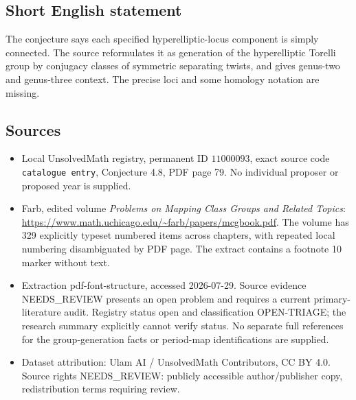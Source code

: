 \documentclass[11pt]{article}
\begin{document}
\subsection{Short English statement}
The conjecture says each specified hyperelliptic-locus component is simply connected. The source reformulates it as generation of the hyperelliptic Torelli group by conjugacy classes of symmetric separating twists, and gives genus-two and genus-three context. The precise loci and some homology notation are missing.
\subsection{Sources}
\begin{itemize}
\item Local UnsolvedMath registry, permanent ID \(11000093\), exact source code \texttt{catalogue entry}, Conjecture 4.8, PDF page 79. No individual proposer or proposed year is supplied.
\item Farb, edited volume \emph{Problems on Mapping Class Groups and Related Topics}: \url{https://www.math.uchicago.edu/~farb/papers/mcgbook.pdf}. The volume has 329 explicitly typeset numbered items across chapters, with repeated local numbering disambiguated by PDF page. The extract contains a footnote 10 marker without text.
\item Extraction pdf-font-structure, accessed 2026-07-29. Source evidence NEEDS\_REVIEW presents an open problem and requires a current primary-literature audit. Registry status open and classification OPEN-TRIAGE; the research summary explicitly cannot verify status. No separate full references for the group-generation facts or period-map identifications are supplied.
\item Dataset attribution: Ulam AI / UnsolvedMath Contributors, CC BY 4.0. Source rights NEEDS\_REVIEW: publicly accessible author/publisher copy, redistribution terms requiring review.
\end{itemize}
\end{document}
